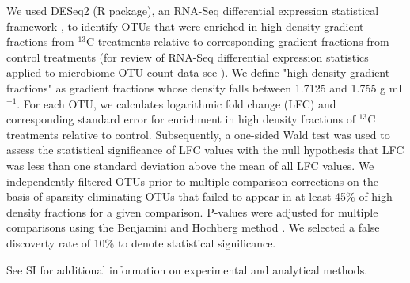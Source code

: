 We used DESeq2 (R package), an RNA-Seq differential expression statistical
framework \citep{love2014}, to identify OTUs that were enriched in high density
gradient fractions from $^{13}$C-treatments relative to corresponding gradient
fractions from control treatments (for review of RNA-Seq differential
expression statistics applied to microbiome OTU count data see
\citep{McMurdie2014}). We define "high density gradient fractions" as gradient
fractions whose density falls between 1.7125 and 1.755 g ml$^{-1}$. For each OTU,
we calculates logarithmic fold change (LFC) and corresponding standard error for
enrichment in high density fractions of $^{13}$C treatments relative to control.
Subsequently, a one-sided Wald test was used to assess the statistical significance
of LFC values with the null hypothesis that LFC was less than one standard deviation
above the mean of all LFC values. We independently filtered OTUs prior to multiple
comparison corrections on the basis of sparsity eliminating OTUs that failed to 
appear in at least 45\% of high density fractions for a given comparison. P-values
were adjusted for multiple comparisons using the Benjamini and Hochberg method
\citep{benjamini1995}. We selected a false discoverty rate of 10\% to denote
statistical significance.



See SI for additional information on experimental and analytical methods.
